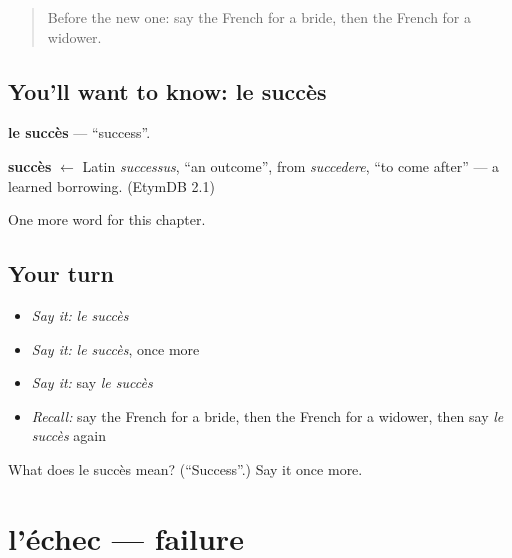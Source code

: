 \label{lesson:FR-C197-succes}



\begin{quote}
Before the new one: say the French for a bride, then the French for a widower.
\end{quote}

\subsection*{You'll want to know: le succès}
\textbf{le succès} — \textquotedblleft{}success\textquotedblright{}.

\begin{cousinweb}
\textbf{succès} $\leftarrow$ Latin \emph{successus}, \textquotedblleft{}an outcome\textquotedblright{}, from \emph{succedere}, \textquotedblleft{}to come after\textquotedblright{} — a learned borrowing. (EtymDB 2.1)
\end{cousinweb}

\begin{grammarlens}[title={What you've built}]
One more word for this chapter.
\end{grammarlens}

\subsection*{Your turn}
\begin{itemize}
\raggedright
  \item \emph{Say it:} \emph{le succès}
  \item \emph{Say it:} \emph{le succès}, once more
  \item \emph{Say it:} say \emph{le succès}
  \item \emph{Recall:} say the French for a bride, then the French for a widower, then say \emph{le succès} again
\end{itemize}

\begin{tcolorbox}[breakable,colback=teal!4,colframe=teal!35!black,title={Before you move on}]
What does le succès mean? (\textquotedblleft{}Success\textquotedblright{}.) Say it once more.
\end{tcolorbox}
\section[l'échec]{l'échec — failure}

\label{lesson:FR-C197-echec}



